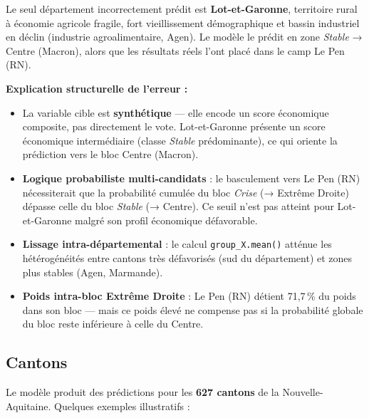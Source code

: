 \documentclass[12pt,a4paper,oneside]{report}
\newcommand{\code}[1]{\texttt{\small #1}}
\newcommand{\pct}[1]{#1\,\%}
\begin{document}
Le seul département incorrectement prédit est \textbf{Lot-et-Garonne}, territoire rural à économie agricole fragile, fort vieillissement démographique et bassin industriel en déclin (industrie agroalimentaire, Agen). Le modèle le prédit en zone \textit{Stable} → Centre (Macron), alors que les résultats réels l'ont placé dans le camp Le Pen (RN).

\textbf{Explication structurelle de l'erreur :}

\begin{itemize}
  \item La variable cible est \textbf{synthétique} — elle encode un score économique composite, pas directement le vote. Lot-et-Garonne présente un score économique intermédiaire (classe \textit{Stable} prédominante), ce qui oriente la prédiction vers le bloc Centre (Macron).

  \item \textbf{Logique probabiliste multi-candidats} : le basculement vers Le Pen (RN) nécessiterait que la probabilité cumulée du bloc \textit{Crise} (→ Extrême Droite) dépasse celle du bloc \textit{Stable} (→ Centre). Ce seuil n'est pas atteint pour Lot-et-Garonne malgré son profil économique défavorable.

  \item \textbf{Lissage intra-départemental} : le calcul \code{group\_X.mean()} atténue les hétérogénéités entre cantons très défavorisés (sud du département) et zones plus stables (Agen, Marmande).

  \item \textbf{Poids intra-bloc Extrême Droite} : Le Pen (RN) détient \pct{71,7} du poids dans son bloc — mais ce poids élevé ne compense pas si la probabilité globale du bloc reste inférieure à celle du Centre.
\end{itemize}

\subsection{Cantons}

Le modèle produit des prédictions pour les \textbf{627 cantons} de la Nouvelle-Aquitaine. Quelques exemples illustratifs :
\end{document}
